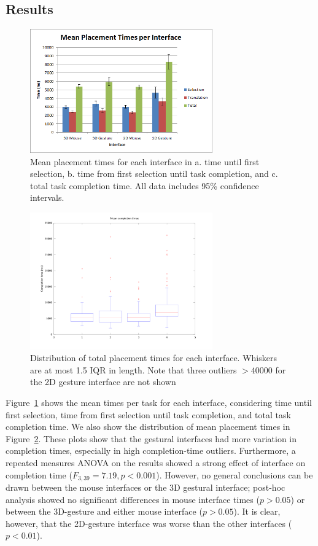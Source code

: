 \documentclass[pageno]{jpaper}
\begin{document}
\subsection{Results}
\begin{figure}
\centering
\includegraphics[width=0.7\textwidth]{figures/aggmean.png}
\caption{Mean placement times for each interface in a. time until first
selection, b. time from first selection until task completion, and c. total task
completion time. All data includes 95\% confidence intervals.}
\label{fig:aggregate}
\end{figure}
\begin{figure}
\centering
\includegraphics[width=0.7\textwidth]{figures/distribution.png}
\caption{Distribution of total placement times for each interface. Whiskers are
 at most 1.5 IQR in length. Note that three outliers $> 40000$ for the 2D gesture interface are not
shown}
\label{fig:distr}
\end{figure}
Figure~\ref{fig:aggregate} shows the mean times per task for each interface, considering time until first selection, time from first selection until
task completion, and total task completion time. We also show the distribution
of mean placement times in Figure~\ref{fig:distr}. These plots show that the gestural interfaces had more variation in completion times, especially in high completion-time
outliers. Furthermore, a repeated measures ANOVA on the results showed a strong effect of
interface on completion time ($F_{3,39}=7.19, p < 0.001$).
However, no general conclusions can be drawn between the mouse interfaces or the 3D gestural interface; post-hoc analysis showed no significant differences
in mouse interface times ($p > 0.05$) or between the 3D-gesture and either mouse interface ($p > 0.05$). It is clear, however, that the 2D-gesture interface
was worse than the other interfaces ($p < 0.01$).
\end{document}
